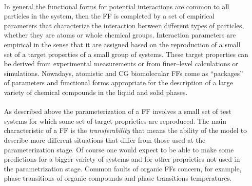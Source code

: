 \paragraph{\textbf{}} In general the functional forms for potential interactions are common to all particles in the system, then the \ac{FF} is completed by a set of empirical parameters that characterize the interaction between different types of particles, whether they are atoms or whole chemical groups. Interaction parameters are empirical in the sense that it are assigned based on the reproduction of a small set of a target properties of a small group of systems. These target properties can be derived from experimental measurements or from finer--level calculations or simulations. Nowadays, atomistic and \ac{CG} biomolecular \acp{FF} come as ``packages'' of parameters and functional forms appropriate for the description of a large variety of chemical compounds in the liquid and solid phases.

\paragraph{\textbf{}} As described above the parameterization of a \ac{FF} involves a small set of test systems for which some set of target proprieties are reproduced. The main characteristic of a \ac{FF} is the \textit{transferability} that means the ability of the model to describe more different situations that differ from those used at the parameterization stage. Of course one would expect to be able to make some predictions for a bigger variety of systems and for other proprieties not used in the parametrization stage. Common faults of organic \acp{FF} concern, for example, phase transitions of organic compounds and phase transitions temperatures.

